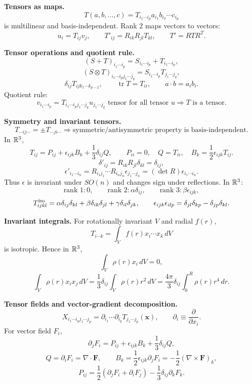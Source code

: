 \noindent\textbf{Tensors as maps.}
\[
T(a,b,\ldots,c)=T_{i_1\cdots i_p}a_{i_1}b_{i_2}\cdots c_{i_p}
\]
is multilinear and basis-independent. Rank $2$ maps vectors to vectors:
\[
u_i=T_{ij}v_j,\qquad
T'_{ij}=R_{ik}R_{jl}T_{kl},\qquad T'=RTR^T.
\]

\noindent\textbf{Tensor operations and quotient rule.}
\[
(S+T)_{i_1\cdots i_p}=S_{i_1\cdots i_p}+T_{i_1\cdots i_p},
\]
\[
(S\otimes T)_{i_1\cdots i_pj_1\cdots j_q}
=S_{i_1\cdots i_p}T_{j_1\cdots j_q},
\]
\[
\delta_{ij}T_{ijk_1\cdots k_{p-2}},\qquad
\operatorname{tr}T=T_{ii},\qquad
a\cdot b=a_ib_i.
\]
Quotient rule:
\[
v_{i_1\cdots i_p}
=T_{i_1\cdots i_pj_1\cdots j_q}u_{j_1\cdots j_q}
\text{ tensor for all tensor }u
\Rightarrow T\text{ is a tensor}.
\]

\noindent\textbf{Symmetry and invariant tensors.}
\[
T_{\cdots ij\cdots}=\pm T_{\cdots ji\cdots}
\Rightarrow \text{symmetric/antisymmetric property is basis-independent}.
\]
In $\mathbb{R}^3$,
\[
T_{ij}=P_{ij}+\epsilon_{ijk}B_k+\frac13\delta_{ij}Q,
\qquad
P_{ii}=0,\quad Q=T_{ii},\quad
B_k=\frac12\epsilon_{ijk}T_{ij}.
\]
\[
\delta'_{ij}=R_{ik}R_{jl}\delta_{kl}=\delta_{ij},
\]
\[
\epsilon'_{i_1\cdots i_n}
=R_{i_1j_1}\cdots R_{i_nj_n}\epsilon_{j_1\cdots j_n}
=(\det R)\epsilon_{i_1\cdots i_n}.
\]
Thus $\epsilon$ is invariant under $SO(n)$ and changes sign under reflections.
In $\mathbb{R}^3$:
\[
\text{rank }1:0,\qquad
\text{rank }2:\alpha\delta_{ij},\qquad
\text{rank }3:\beta\epsilon_{ijk},
\]
\[
T_{ijkl}^{\rm iso}
=\alpha\delta_{ij}\delta_{kl}
+\beta\delta_{ik}\delta_{jl}
+\gamma\delta_{il}\delta_{jk},
\qquad
\epsilon_{ijk}\epsilon_{ilp}
=\delta_{jl}\delta_{kp}-\delta_{jp}\delta_{kl}.
\]

\noindent\textbf{Invariant integrals.}
For rotationally invariant $V$ and radial $f(r)$,
\[
T_{i\cdots k}=\int_V f(r)x_i\cdots x_k\,dV
\]
is isotropic. Hence in $\mathbb{R}^3$,
\[
\int_V\rho(r)x_i\,dV=0,
\]
\[
\int_V\rho(r)x_ix_j\,dV
=\frac13\delta_{ij}\int_V\rho(r)r^2\,dV
=\frac{4\pi}{3}\delta_{ij}\int_0^R\rho(r)r^4\,dr.
\]

\noindent\textbf{Tensor fields and vector-gradient decomposition.}
\[
X_{i_1\cdots i_qj_1\cdots j_p}
=\partial_{i_1}\cdots\partial_{i_q}
T_{j_1\cdots j_p}(\mathbf{x}),\qquad
\partial_i\equiv\frac{\partial}{\partial x_i}.
\]
For vector field $F_i$,
\[
\partial_jF_i=P_{ij}+\epsilon_{ijk}B_k+\frac13\delta_{ij}Q,
\]
\[
Q=\partial_iF_i=\nabla\cdot\mathbf{F},\qquad
B_k=\frac12\epsilon_{ijk}\partial_jF_i
=-\frac12(\nabla\times\mathbf{F})_k,
\]
\[
P_{ij}=\frac12(\partial_jF_i+\partial_iF_j)
-\frac13\delta_{ij}\partial_kF_k.
\]

